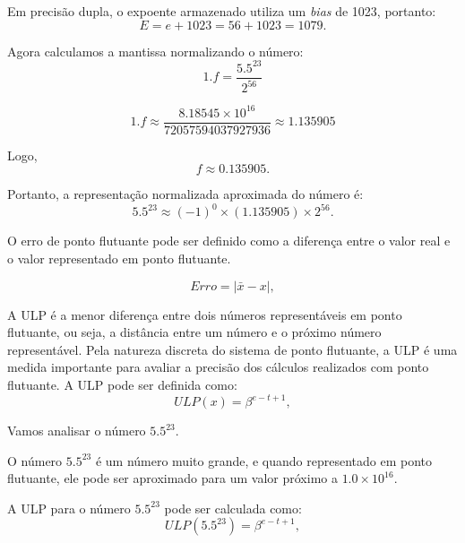 Em precisão dupla, o expoente armazenado utiliza um \textit{bias} de 1023,
portanto:
\begin{equation}
  E = e + 1023 = 56 + 1023 = 1079.
\end{equation}

Agora calculamos a mantissa normalizando o número:
\begin{equation}
  1.f = \frac{5.5^{23}}{2^{56}}
\end{equation}

\begin{equation}
  1.f \approx \frac{8.18545 \times 10^{16}}{72057594037927936} \approx 1.135905
\end{equation}

Logo,
\begin{equation}
  f \approx 0.135905.
\end{equation}

Portanto, a representação normalizada aproximada do número é:
\begin{equation}
  5.5^{23} \approx (-1)^0 \times (1.135905) \times 2^{56}.
\end{equation}

O erro de ponto flutuante pode ser definido como a diferença entre o valor real
e o valor representado em ponto flutuante.

\begin{equation}
  Erro = \left|\bar{x} - x\right|,
\end{equation}

A ULP é a menor diferença entre dois números representáveis em ponto flutuante,
ou seja, a distância entre um número e o próximo número representável. Pela
natureza discreta do sistema de ponto flutuante, a ULP é uma medida importante
para avaliar a precisão dos cálculos realizados com ponto flutuante. A ULP pode
ser definida como:
\begin{equation}
  ULP(x) = \beta^{e - t + 1},
  \label{eq:ulp}
\end{equation}

Vamos analisar o número $5.5^{23}$.

O número $5.5^{23}$ é um número muito grande, e quando representado em ponto
flutuante, ele pode ser aproximado para um valor próximo a $1.0 \times
  10^{16}$.

A ULP para o número $5.5^{23}$ pode ser calculada como:
\begin{equation}
  ULP(5.5^{23}) = \beta^{e - t + 1},
\end{equation}

